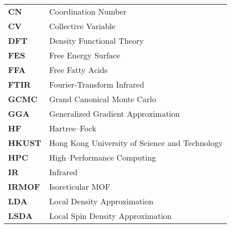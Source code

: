 \begin{longtable}{p{} p{}}
\textbf{CN} & Coordination Number \\
\textbf{CV} & Collective Variable \\
\textbf{DFT} & Density Functional Theory \\
\textbf{FES} & Free Energy Surface \\
\textbf{FFA} & Free Fatty Acids \\
\textbf{FTIR} & Fourier-Transform Infrared \\
\textbf{GCMC} & Grand Canonical Monte Carlo \\
\textbf{GGA} & Generalized Gradient Approximation \\
\textbf{HF} & Hartree--Fock \\
\textbf{HKUST} & Hong Kong University of Science and Technology \\
\textbf{HPC} & High--Performance Computing \\ 
\textbf{IR} & Infrared\\
\textbf{IRMOF} & Isoreticular MOF \\
\textbf{LDA} & Local Density Approximation \\%
\textbf{LSDA} & Local Spin Density Approximation \\

\end{longtable}
